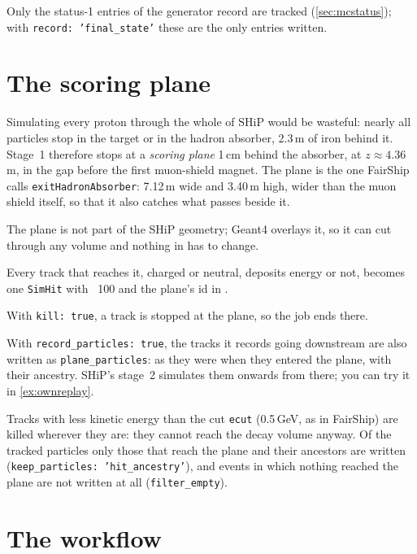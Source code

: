 Only the status-1 entries of the generator record are tracked
(\cref{sec:mcstatus}); with \texttt{record: 'final\_state'} these are the only
entries written.

\section{The scoring plane}
\label{sec:scoringplane}

Simulating every proton through the whole of SHiP would be wasteful: nearly
all particles stop in the target or in the hadron absorber, 2.3\,m of iron
behind it. Stage~1 therefore stops at a \emph{scoring plane} 1\,cm behind the
absorber, at $z\approx4.36$\,m, in the gap before the first muon-shield
magnet. The plane is the one FairShip calls \texttt{exitHadronAbsorber}:
7.12\,m wide and 3.40\,m high, wider than the muon shield itself, so that it
also catches what passes beside it.

\begin{description}[style=nextline]
  \item[It lives in a parallel world.] The plane is not part of the SHiP
    geometry; Geant4 overlays it, so it can cut through any volume and
    nothing in  has to change.
  \item[It records everything.] Every track that reaches it, charged or
    neutral, deposits energy or not, becomes one \texttt{SimHit} with
    ~100 and the plane's id in .
  \item[It kills.] With \texttt{kill: true}, a track is stopped at the plane,
    so the job ends there.
  \item[It hands over to stage 2.] With \texttt{record\_particles: true}, the
    tracks it records going downstream are also written as
    \texttt{plane\_particles}: as they were when they entered the plane, with
    their ancestry. SHiP's stage~2 simulates them onwards from there; you
    can try it in \cref{ex:ownreplay}.
\end{description}

Tracks with less kinetic energy than the cut \texttt{ecut} (0.5\,GeV, as in
FairShip) are killed wherever they are: they cannot reach the decay volume
anyway. Of the tracked particles only those that reach the plane and their
ancestors are written (\texttt{keep\_particles: 'hit\_ancestry'}), and events
in which nothing reached the plane are not written at all
(\texttt{filter\_empty}).

\section{The workflow}

